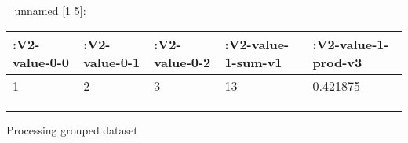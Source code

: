 \documentclass[]{article}
\newenvironment{Shaded}{\begin{snugshade}}{\end{snugshade}}
\newcommand{\AttributeTok}[1]{\textcolor[rgb]{0.77,0.63,0.00}{#1}}
\newcommand{\DecValTok}[1]{\textcolor[rgb]{0.00,0.00,0.81}{#1}}
\newcommand{\KeywordTok}[1]{\textcolor[rgb]{0.13,0.29,0.53}{\textbf{#1}}}
\newcommand{\NormalTok}[1]{#1}
\newcommand{\StringTok}[1]{\textcolor[rgb]{0.31,0.60,0.02}{#1}}
\newcommand{\VariableTok}[1]{\textcolor[rgb]{0.00,0.00,0.00}{#1}}
\begin{document}
\_unnamed {[}1 5{]}:

\begin{longtable}[]{@{}lllll@{}}
\toprule
\begin{minipage}[b]{0.15\columnwidth}\raggedright
:V2-value-0-0\strut
\end{minipage} & \begin{minipage}[b]{0.15\columnwidth}\raggedright
:V2-value-0-1\strut
\end{minipage} & \begin{minipage}[b]{0.15\columnwidth}\raggedright
:V2-value-0-2\strut
\end{minipage} & \begin{minipage}[b]{0.20\columnwidth}\raggedright
:V2-value-1-sum-v1\strut
\end{minipage} & \begin{minipage}[b]{0.21\columnwidth}\raggedright
:V2-value-1-prod-v3\strut
\end{minipage}\tabularnewline
\midrule
\endhead
\begin{minipage}[t]{0.15\columnwidth}\raggedright
1\strut
\end{minipage} & \begin{minipage}[t]{0.15\columnwidth}\raggedright
2\strut
\end{minipage} & \begin{minipage}[t]{0.15\columnwidth}\raggedright
3\strut
\end{minipage} & \begin{minipage}[t]{0.20\columnwidth}\raggedright
13\strut
\end{minipage} & \begin{minipage}[t]{0.21\columnwidth}\raggedright
0.421875\strut
\end{minipage}\tabularnewline
\bottomrule
\end{longtable}

\begin{center}\rule{0.5\linewidth}{0.5pt}\end{center}

Processing grouped dataset

\begin{Shaded}
\end{Shaded}
\end{document}

